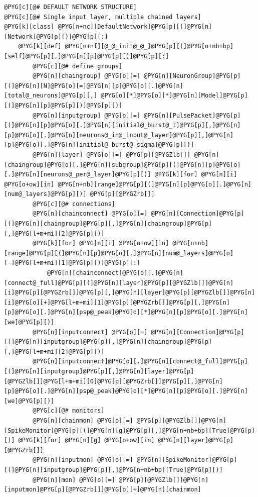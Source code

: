\documentclass[letterpaper,10pt,english]{manual}
\begin{document}
\begin{Verbatim}[commandchars=@\[\]]
@PYG[c][@# DEFAULT NETWORK STRUCTURE]
@PYG[c][@# Single input layer, multiple chained layers]
@PYG[k][class] @PYG[n+nc][DefaultNetwork]@PYG[p][(]@PYG[n][Network]@PYG[p][)]@PYG[p][:]
    @PYG[k][def] @PYG[n+nf][@_@_init@_@_]@PYG[p][(]@PYG[n+nb+bp][self]@PYG[p][,]@PYG[n][p]@PYG[p][)]@PYG[p][:]
        @PYG[c][@# define groups]
        @PYG[n][chaingroup] @PYG[o][=] @PYG[n][NeuronGroup]@PYG[p][(]@PYG[n][N]@PYG[o][=]@PYG[n][p]@PYG[o][.]@PYG[n][total@_neurons]@PYG[p][,] @PYG[o][*]@PYG[o][*]@PYG[n][Model]@PYG[p][(]@PYG[n][p]@PYG[p][)]@PYG[p][)]
        @PYG[n][inputgroup] @PYG[o][=] @PYG[n][PulsePacket]@PYG[p][(]@PYG[n][p]@PYG[o][.]@PYG[n][initial@_burst@_t]@PYG[p][,]@PYG[n][p]@PYG[o][.]@PYG[n][neurons@_in@_input@_layer]@PYG[p][,]@PYG[n][p]@PYG[o][.]@PYG[n][initial@_burst@_sigma]@PYG[p][)]
        @PYG[n][layer] @PYG[o][=] @PYG[p][@PYGZlb[]] @PYG[n][chaingroup]@PYG[o][.]@PYG[n][subgroup]@PYG[p][(]@PYG[n][p]@PYG[o][.]@PYG[n][neurons@_per@_layer]@PYG[p][)] @PYG[k][for] @PYG[n][i] @PYG[o+ow][in] @PYG[n+nb][range]@PYG[p][(]@PYG[n][p]@PYG[o][.]@PYG[n][num@_layers]@PYG[p][)] @PYG[p][@PYGZrb[]]
        @PYG[c][@# connections]
        @PYG[n][chainconnect] @PYG[o][=] @PYG[n][Connection]@PYG[p][(]@PYG[n][chaingroup]@PYG[p][,]@PYG[n][chaingroup]@PYG[p][,]@PYG[l+m+mi][2]@PYG[p][)]
        @PYG[k][for] @PYG[n][i] @PYG[o+ow][in] @PYG[n+nb][range]@PYG[p][(]@PYG[n][p]@PYG[o][.]@PYG[n][num@_layers]@PYG[o][-]@PYG[l+m+mi][1]@PYG[p][)]@PYG[p][:]
            @PYG[n][chainconnect]@PYG[o][.]@PYG[n][connect@_full]@PYG[p][(]@PYG[n][layer]@PYG[p][@PYGZlb[]]@PYG[n][i]@PYG[p][@PYGZrb[]]@PYG[p][,]@PYG[n][layer]@PYG[p][@PYGZlb[]]@PYG[n][i]@PYG[o][+]@PYG[l+m+mi][1]@PYG[p][@PYGZrb[]]@PYG[p][,]@PYG[n][p]@PYG[o][.]@PYG[n][psp@_peak]@PYG[o][*]@PYG[n][p]@PYG[o][.]@PYG[n][we]@PYG[p][)]
        @PYG[n][inputconnect] @PYG[o][=] @PYG[n][Connection]@PYG[p][(]@PYG[n][inputgroup]@PYG[p][,]@PYG[n][chaingroup]@PYG[p][,]@PYG[l+m+mi][2]@PYG[p][)]
        @PYG[n][inputconnect]@PYG[o][.]@PYG[n][connect@_full]@PYG[p][(]@PYG[n][inputgroup]@PYG[p][,]@PYG[n][layer]@PYG[p][@PYGZlb[]]@PYG[l+m+mi][0]@PYG[p][@PYGZrb[]]@PYG[p][,]@PYG[n][p]@PYG[o][.]@PYG[n][psp@_peak]@PYG[o][*]@PYG[n][p]@PYG[o][.]@PYG[n][we]@PYG[p][)]
        @PYG[c][@# monitors]
        @PYG[n][chainmon] @PYG[o][=] @PYG[p][@PYGZlb[]]@PYG[n][SpikeMonitor]@PYG[p][(]@PYG[n][g]@PYG[p][,]@PYG[n+nb+bp][True]@PYG[p][)] @PYG[k][for] @PYG[n][g] @PYG[o+ow][in] @PYG[n][layer]@PYG[p][@PYGZrb[]]
        @PYG[n][inputmon] @PYG[o][=] @PYG[n][SpikeMonitor]@PYG[p][(]@PYG[n][inputgroup]@PYG[p][,]@PYG[n+nb+bp][True]@PYG[p][)]
        @PYG[n][mon] @PYG[o][=] @PYG[p][@PYGZlb[]]@PYG[n][inputmon]@PYG[p][@PYGZrb[]]@PYG[o][+]@PYG[n][chainmon]

\end{Verbatim}
\end{document}
